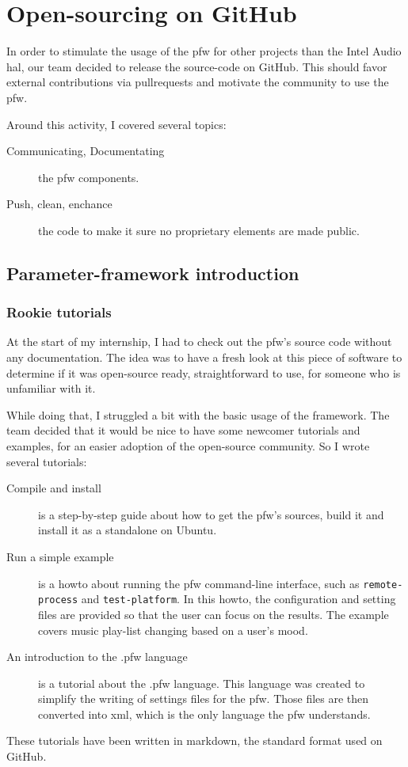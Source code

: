 \section{Open-sourcing on GitHub}
In order to stimulate the usage of the \gls{pfw} for other projects than the Intel Audio \gls{hal},
our team decided to release the source-code on \gls{GitHub}.
This should favor external contributions via \gls{pullrequests} and motivate
the community to use the \gls{pfw}.

Around this activity, I covered several topics:
\begin{description}
    \item[Communicating, Documentating] the \gls{pfw} components.
    \item[Push, clean, enchance] the code to make it sure no proprietary
        elements are made public.
\end{description}

\subsection{Parameter-framework introduction}
\subsubsection{Rookie tutorials}\label{sec:tutorials}

At the start of my internship, I had to check out the \gls{pfw}'s
source code without any documentation. The idea was to have a fresh look at
this piece of software to determine if it was open-source ready, straightforward
to use, for someone who is unfamiliar with it.

While doing that, I struggled a bit with the basic usage of the framework. The
team decided that it would be nice to have some newcomer tutorials and examples,
for an easier adoption of the open-source community. So I wrote several
tutorials:
\begin{description}
    \item[Compile and install]
        is a step-by-step guide about how to get the \gls{pfw}'s sources,
        build it and install it as a standalone on Ubuntu.
    \item[Run a simple example]
        is a howto about running the \gls{pfw} command-line interface,
        such as \lstinline{remote-process} and \lstinline {test-platform}.  In
        this howto, the configuration and setting files are provided so that
        the user can focus on the results. The example covers music play-list
        changing based on a user's mood.
    \item[An introduction to the .pfw language]\label{desc:pfw-language}
        is a tutorial about the .pfw language. This language was
        created to simplify the writing of settings files for the
        \gls{pfw}. Those files are then converted into \gls{xml}, which is
        the only language the \gls{pfw} understands.
\end{description}
These tutorials have been written in \gls{markdown}, the standard format used
on \gls{GitHub}.

